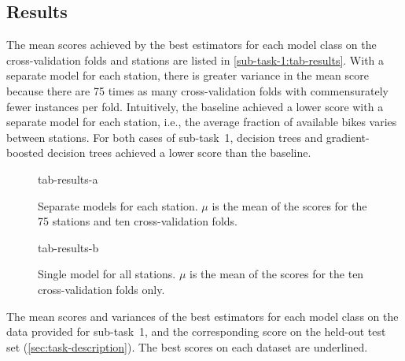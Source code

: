 \subsection{Results}
\label{sec:sub-task-1:results}

The mean scores achieved by the best estimators for each model class on the
cross-validation folds and stations are listed in \cref{sub-task-1:tab-results}.
With a separate model for each station, there is greater variance in the mean score
because there are 75 times as many cross-validation folds with commensurately fewer
instances per fold.
Intuitively, the baseline achieved a lower score with a separate model for each
station, i.e., the average fraction of available bikes varies between stations.
For both cases of sub-task~1, decision trees and gradient-boosted decision trees
achieved a lower score than the baseline.

\begin{table}
  \centering
  \begin{subfigure}{0.5\textwidth}
    \centering
    {tab-results-a}
    \caption{
      Separate models for each station.
      $\mu$ is the mean of the scores for the 75 stations and ten cross-validation folds.
    }
    \label{sub-task-1:tab-results-a}
  \end{subfigure}
  \subfigurespace
  \begin{subfigure}{0.5\textwidth}
    \centering
    {tab-results-b}
    \caption{
      Single model for all stations.
      $\mu$ is the mean of the scores for the ten cross-validation folds only.}
    \label{sub-task-1:tab-results-b}
  \end{subfigure}
  \caption{
    The mean scores and variances of the best estimators for each model class on the
    data provided for sub-task~1, and the corresponding score on the held-out test set
    (\cref{sec:task-description}).
    The best scores on each dataset are underlined.
  }
  \label{sub-task-1:tab-results}
\end{table}

